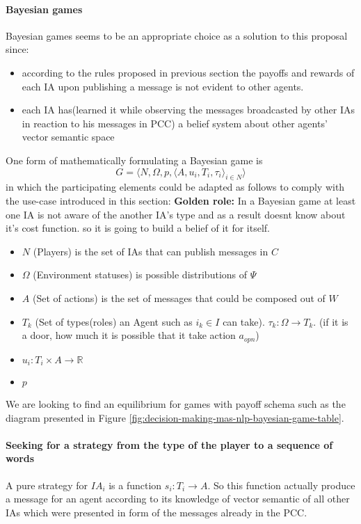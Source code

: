 \documentclass{article}
\begin{document}
\begin{multicols}{2}
			\paragraph{Bayesian games} 
				Bayesian games seems to be an appropriate choice as a solution to this proposal since:
				\begin{itemize}
					\item according to the rules proposed in previous section the payoffs and rewards of each IA upon publishing a message is not evident to other agents.
					\item each IA has(learned it while observing the messages broadcasted by other IAs in reaction to his messages in PCC) a belief system about other agents' vector semantic space
				\end{itemize}
				One form of mathematically formulating a Bayesian game is 
				\begin{equation}
						G=\langle N, \Omega ,p,\langle A,u_{i},T_{i},\tau _{i}\rangle _{i\in N}\rangle
						\label{eq:bayesian-game}
					\end{equation}
					in which the participating  elements could be adapted as follows to comply with the use-case introduced in this section:
					\textbf{Golden role:} In a Bayesian game at least one IA is not aware of the another IA's type and as a result doesnt know about it's cost function. so it is going to build a belief of it for itself.  
					\begin{itemize}
						\item $N$ (Players) is the set of IAs that can publish messages in $C$
						\item $\Omega$ (Environment statuses) is possible distributions of $\Psi$	
						\item $A$ (Set of actions) is the set of messages that could be composed out of $W$
						\item $T_{k}$ (Set of types(roles) an Agent such as $i_k \in I$ can take). $\tau _{k}: \Omega \rightarrow T_{k}$. (if it is a door, how much it is possible that it take action $a_{opn}$)
						\item $u_{i}\colon T_{i}\times A\rightarrow \mathbb {R}$
						
						\item $p$
					\end{itemize} 
				We are looking to find an equilibrium for games with payoff schema such as the diagram presented in Figure \ref{fig:decision-making-mas-nlp-bayesian-game-table}. 
				
				\paragraph{Seeking for a strategy from the type of the player to a sequence of words} A pure strategy for ${IA}_i$ is a function $s_{i}\colon T_{i}\rightarrow A$. So this function actually produce a message for an agent  according to its knowledge of vector semantic of all other IAs which were presented in form of the messages already in the PCC. 
				

\end{multicols}
\end{document}
